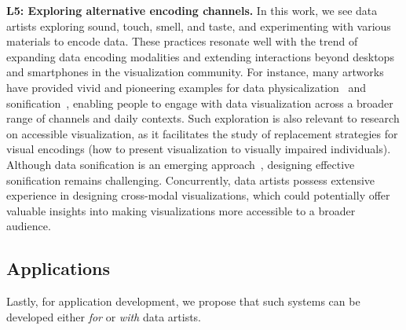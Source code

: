 \textbf{L5: Exploring alternative encoding channels.}
In this work, we see data artists exploring sound, touch, smell, and taste, and experimenting with various materials to encode data. These practices resonate well with the trend of expanding data encoding modalities and extending interactions beyond desktops and smartphones in the visualization community. For instance, many artworks have provided vivid and pioneering examples for data physicalization~\cite{hornecker2023design} and sonification~\cite{enge2024open}, enabling people to engage with data visualization across a broader range of channels and daily contexts.
Such exploration is also relevant to research on accessible visualization, as it facilitates the study of replacement strategies for visual encodings (\eg how to present visualization to visually impaired individuals). Although data sonification is an emerging approach~\cite{holloway2022infosonics}, designing effective sonification remains challenging. Concurrently, data artists possess extensive experience in designing cross-modal visualizations, which could potentially offer valuable insights into making visualizations more accessible to a broader audience.



\subsection{Applications}

Lastly, for application development, we propose that such systems can be developed either \textit{for} or \textit{with} data artists.

